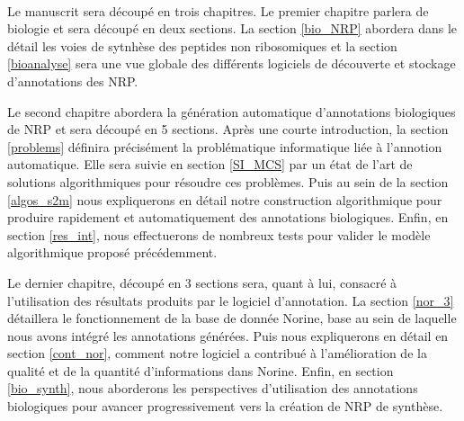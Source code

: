 ~~

Le manuscrit sera découpé en trois chapitres.
Le premier chapitre parlera de biologie et sera découpé en deux sections.
La section \ref{bio_NRP} abordera dans le détail les voies de sytnhèse des peptides non ribosomiques et la section \ref{bioanalyse} sera une vue globale des différents logiciels de découverte et stockage d'annotations des NRP.

Le second chapitre abordera la génération automatique d'annotations biologiques de NRP et sera découpé en 5 sections.
Après une courte introduction, la section \ref{problems} définira précisément la problématique informatique liée à l'annotion automatique.
Elle sera suivie en section \ref{SI_MCS} par un état de l'art de solutions algorithmiques pour résoudre ces problèmes.
Puis au sein de la section \ref{algos_s2m} nous expliquerons en détail notre construction algorithmique pour produire rapidement et automatiquement des annotations biologiques.
Enfin, en section \ref{res_int}, nous effectuerons de nombreux tests pour valider le modèle algorithmique proposé précédemment.

Le dernier chapitre, découpé en 3 sections sera, quant à lui, consacré à l'utilisation des résultats produits par le logiciel d'annotation.
La section \ref{nor_3} détaillera le fonctionnement de la base de donnée Norine, base au sein de laquelle nous avons intégré les annotations générées.
Puis nous expliquerons en détail en section \ref{cont_nor}, comment notre logiciel a contribué à l'amélioration de la qualité et de la quantité d'informations dans Norine.
Enfin, en section \ref{bio_synth}, nous aborderons les perspectives d'utilisation des annotations biologiques pour avancer progressivement vers la création de NRP de synthèse.